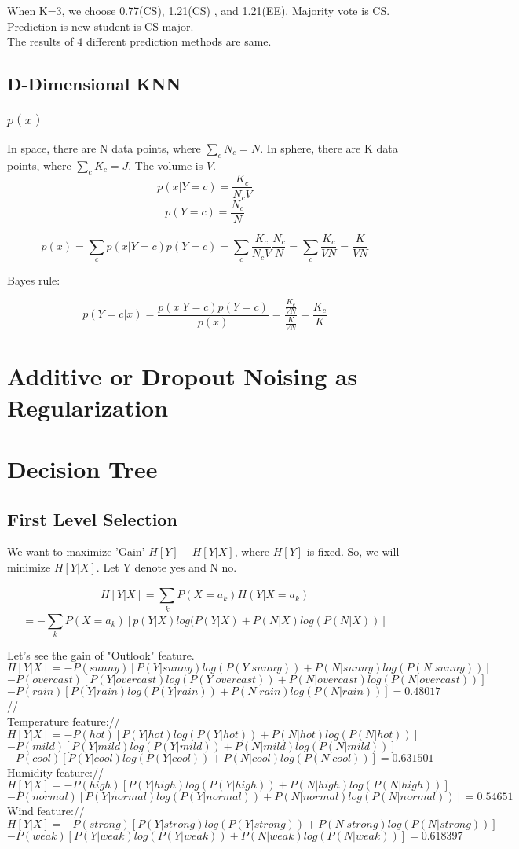 \documentclass[11pt]{article}
\begin{document}
	When K=3, we choose 0.77(CS), 1.21(CS) , and 1.21(EE). Majority vote is CS. Prediction is new student is CS major.\\
	
	The results of 4 different prediction methods are same. 
	
	\subsection{D-Dimensional KNN}
	\subsubsection{$p(x)$}
	In space, there are N data points, where $\sum_{c}^{}N_c=N$. In sphere, there are K data points, where $\sum_{c}^{}K_c=J$. The volume is $V$.
	$$p(x|Y=c) = \frac{K_c}{N_cV}$$ $$p(Y=c)=\frac{N_c}{N}$$
	
	$$p(x)=\sum_{c}^{}p(x|Y=c)p(Y=c)=\sum_{c}^{}\frac{K_c}{N_cV}\frac{N_c}{N}=\sum_{c}^{}\frac{K_c}{VN}=\frac{K}{VN}$$
	
	Bayes rule:
	
	$$p(Y=c|x) = \frac{p(x|Y=c)p(Y=c)}{p(x)}=\frac{\frac{K_c}{VN}}{\frac{K}{VN}}=\frac{K_c}{K}$$
	
	\section{Additive or Dropout Noising as Regularization}
	\section{Decision Tree}
	\subsection{First Level Selection}
	
	We want to maximize 'Gain' $H[Y]-H[Y|X]$, where $H[Y]$ is fixed. So, we will minimize $H[Y|X]$. Let Y denote yes and N no.
	
	$$H[Y|X]=\sum_{k}^{}P(X=a_k)H(Y|X=a_k)$$
	$$= -\sum_{k}^{}P(X=a_k)[p(Y|X)log(P(Y|X)+P(N|X)log(P(N|X))]$$
	
	Let's see the gain of "Outlook" feature.\\	
	$H[Y|X]=-P(sunny)[P(Y|sunny)log(P(Y|sunny))+P(N|sunny)log(P(N|sunny))]$
	$-P(overcast)[P(Y|overcast)log(P(Y|overcast))+P(N|overcast)log(P(N|overcast))]$
	$-P(rain)[P(Y|rain)log(P(Y|rain))+P(N|rain)log(P(N|rain))] = 0.48017$//
	$$ $$
	Temperature feature://
	$H[Y|X]=-P(hot)[P(Y|hot)log(P(Y|hot))+P(N|hot)log(P(N|hot))]$\\
	$-P(mild)[P(Y|mild)log(P(Y|mild))+P(N|mild)log(P(N|mild))] $\\
	$-P(cool)[P(Y|cool)log(P(Y|cool))+P(N|cool)log(P(N|cool))] = 0.631501$
	$$ $$ 
	Humidity feature://
	$H[Y|X]=-P(high)[P(Y|high)log(P(Y|high))+P(N|high)log(P(N|high))]$\\
	$-P(normal)[P(Y|normal)log(P(Y|normal))+P(N|normal)log(P(N|normal))]=0.54651
	$\\
	$$ $$
	Wind feature://
	$H[Y|X]=-P(strong)[P(Y|strong)log(P(Y|strong))+P(N|strong)log(P(N|strong))]$\\
	$-P(weak)[P(Y|weak)log(P(Y|weak))+P(N|weak)log(P(N|weak))]=0.618397$\\
	
\end{document}

